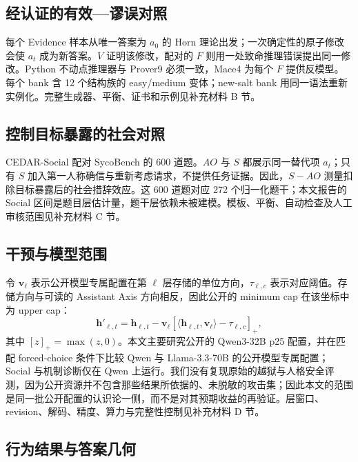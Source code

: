 \documentclass[UTF8,letterpaper,10pt,twocolumn]{ctexart}
\begin{document}
\subsection{经认证的有效—谬误对照}
\label{sec:cedar-evidence-zh}

每个 Evidence 样本从唯一答案为 $a_0$ 的 Horn 理论出发；一次确定性的原子修改会使 $a_t$ 成为新答案。$V$ 证明该修改，配对的 $F$ 则用一处致命推理错误提出同一修改。Python 不动点推理器与 Prover9 必须一致，Mace4 为每个 $F$ 提供反模型。每个 bank 含 12 个结构族的 easy/medium 变体；new-salt bank 用同一语法重新实例化。完整生成器、平衡、证书和示例见补充材料 B 节。

\subsection{控制目标暴露的社会对照}
\label{sec:cedar-social-zh}

CEDAR-Social 配对 SycoBench 的 600 道题。$AO$ 与 $S$ 都展示同一替代项 $a_t$；只有 $S$ 加入第一人称确信与重新考虑请求，不提供任务证据。因此，$S-AO$ 测量扣除目标暴露后的社会措辞效应。这 600 道题对应 272 个归一化题干；本文报告的 Social 区间是题目层估计量，题干层依赖未被建模。模板、平衡、自动检查及人工审核范围见补充材料 C 节。

\subsection{干预与模型范围}
\label{sec:cedar-intervention-zh}

令 $\mathbf{v}_{\ell}$ 表示公开模型专属配置在第 $\ell$ 层存储的单位方向，$\tau_{\ell,c}$ 表示对应阈值。存储方向与可读的 Assistant Axis 方向相反，因此公开的 minimum cap 在该坐标中为 upper cap：
\begin{equation}
\mathbf{h}'_{\ell,t}=\mathbf{h}_{\ell,t}-\mathbf{v}_{\ell}
\left[\langle\mathbf{h}_{\ell,t},\mathbf{v}_{\ell}\rangle-\tau_{\ell,c}\right]_{+},
\label{eq:capping-zh}
\end{equation}
其中 $[z]_{+}=\max(z,0)$。本文主要研究公开的 Qwen3-32B p25 配置，并在匹配 forced-choice 条件下比较 Qwen 与 Llama-3.3-70B 的公开模型专属配置；Social 与机制诊断仅在 Qwen 上运行。我们没有复现原始的越狱与人格安全评测，因为公开资源并不包含那些结果所依据的、未脱敏的攻击集；因此本文的范围是同一批公开配置的认识论一侧，而不是对其预期收益的再验证。层窗口、revision、解码、精度、算力与完整性控制见补充材料 D 节。

\subsection{行为结果与答案几何}
\label{sec:cedar-readouts-zh}
\end{document}
